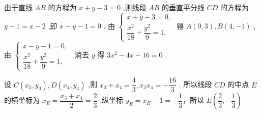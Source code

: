 \begin{enumerate}
\begin{jieda}
\begin{enumerate}
            由于直线 $ {AB} $ 的方程为 $ x + y - 3 = 0 $ ,则线段 $ {AB} $ 的垂直平分线 $ {CD} $ 的方程为 $ y - 1 = x - 2 $ ,即 $ x - y - 1 = 0 $ .
            由 $ \left\{  \begin{array}{l} x + y - 3 = 0, \\  \dfrac{{x}^{2}}{18} + \dfrac{{y}^{2}}{9} = 1, \end{array}\right. $ 得 $ A\left( {0,3}\right) ,B\left( {4, - 1}\right) $ ,由 $ \left\{  \begin{array}{l} x - y - 1 = 0, \\  \dfrac{{x}^{2}}{18} + \dfrac{{y}^{2}}{9} = 1, \end{array}\right. $ ,消去 $ y $ 得 $ 3{x}^{2} - {4x} - {16} = 0 $ .
            
            设 $ C\left( {{x}_{3},{y}_{3}}\right) ,D\left( {{x}_{4},{y}_{4}}\right) $ ,则 $ {x}_{3} + {x}_{4} = \dfrac{4}{3},{x}_{3}{x}_{4} =  - \dfrac{16}{3} $ .
            所以线段 $ {CD} $ 的中点 $ E $ 的横坐标为 $ {x}_{E} = \dfrac{{x}_{3} + {x}_{4}}{2} = \dfrac{2}{3} $ ,纵坐标 $ {y}_{E} = {x}_{E} - 1 =  - \dfrac{1}{3} $，所以 $ E\left( {\dfrac{2}{3}, - \dfrac{1}{3}}\right)$
            

\end{enumerate}
\end{jieda}
\end{enumerate}
